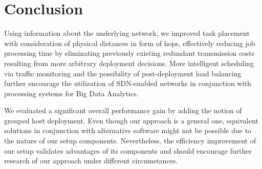 \section{Conclusion}
Using information about the underlying network, we improved task placement with consideration of
physical distances in form of hops, effectively reducing job processing time by eliminating
previously existing redundant transmission costs resulting from more arbitrary deployment decisions.
More intelligent scheduling via traffic monitoring and the possibility of post-deployment load
balancing further encourage the utilization of SDN-enabled networks in conjunction with processing
systems for Big Data Analytics.

We evaluated a significant overall performance gain by adding the notion of grouped host deployment.
Even though our approach is a general one, equivalent solutions in conjunction with alternative
software might not be possible due to the nature of our setup components. Nevertheless,
the efficiency improvement of our setup validates advantages of its components and should
encourage further research of our approach under different circumstances.
